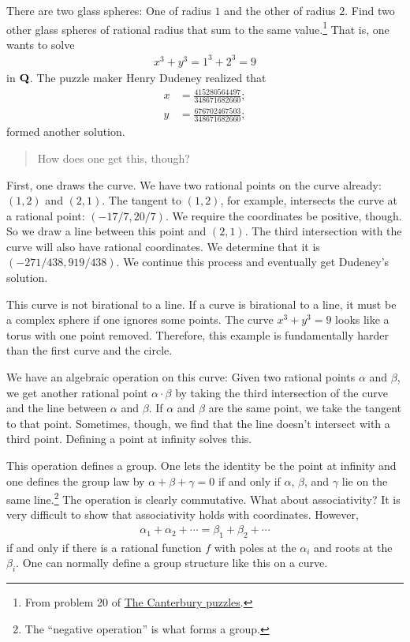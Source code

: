 \documentclass [11 pt, oneside] {article}
\begin{document}
\begin{example}[ ]\label{}\text{}
There are two glass spheres: One of radius $1$ and the other of radius $2$. Find two other glass spheres of rational radius that sum to the same value.\footnote{From problem 20 of \ul{The Canterbury puzzles}.} That is, one wants to solve
\begin{align*}
	x^3 + y^3 = 1^3 + 2^3 = 9
\end{align*}
in $\mathbf Q$. The puzzle maker Henry Dudeney realized that
\begin{align*}
	x &= \frac{415280564497}{348671682660};\\
	y&= \frac{676702467503}{348671682660};
\end{align*}
formed another solution. 
\begin{quote}
	\small How does one get this, though?
\end{quote}

First, one draws the curve. We have two rational points on the curve already: $(1,2)$ and $(2,1)$. The tangent to $(1,2)$, for example, intersects the curve at a rational point: $(-17/7, 20/7)$. We require the coordinates be positive, though. So we draw a line between this point and $(2,1)$. The third intersection with the curve will also have rational coordinates. We determine that it is $(-271/ 438, 919/438)$. We continue this process and eventually get Dudeney's solution. 
\end{example}

This curve is not birational to a line. If a curve is birational to a line, it must be a complex sphere if one ignores some points. The curve $x^3 + y^3 =9$ looks like a torus with one point removed. Therefore, this example is fundamentally harder than the first curve and the circle.

We have an algebraic operation on this curve: Given two rational points $\alpha$ and $\beta$, we get another rational point $\alpha\cdot \beta$ by taking the third intersection of the curve and the line between $\alpha$ and $\beta$. If $\alpha$ and $\beta$ are the same point, we take the tangent to that point. Sometimes, though, we find that the line doesn't intersect with a third point. Defining a point at infinity solves this.

This operation defines a group. One lets the identity be the point at infinity and one defines the group law by $\alpha+\beta+\gamma = 0$ if and only if $\alpha$, $\beta$, and $\gamma$ lie on the same line.\footnote{The ``negative operation'' is what forms a group.} The operation is clearly commutative. What about associativity? It is very difficult to show that associativity holds with coordinates. However,
\begin{align*}
	\alpha_1+\alpha_2+\cdots = \beta_1+\beta_2+\cdots
\end{align*}
if and only if there is a rational function $f$ with poles at the $\alpha_i$ and roots at the $\beta_i$. One can normally define a group structure like this on a curve.
\end{document}
